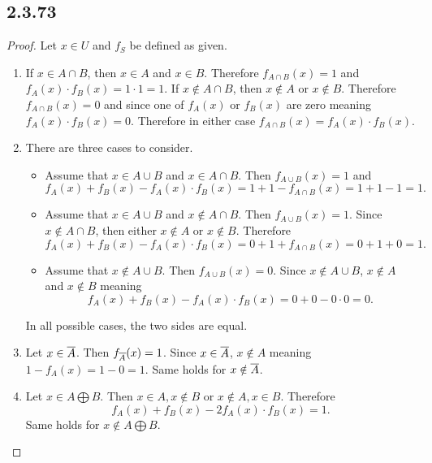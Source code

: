 \documentclass[12pt,titlepage]{extarticle}
\begin{document}
\subsection*{2.3.73}
\begin{proof}
    Let $x \in U$ and $f_S$ be defined as given.
    \begin{enumerate}[label=\alph*)]
        \item %
        If $x \in A \cap B$, then $x \in A$ and $x \in B$. Therefore $f_{A \cap B}(x) = 1$ and $f_{A}(x) \cdot f_{B}(x) = 1 \cdot 1 = 1$. If $x \notin A \cap B$, then $x \notin A$ or $x \notin B$. Therefore $f_{A \cap B}(x) = 0$ and since one of $f_{A}(x)$ or $f_{B}(x)$ are zero meaning $f_{A}(x) \cdot f_{B}(x) = 0$. Therefore in either case $f_{A \cap B}(x) = f_{A}(x) \cdot f_{B}(x)$.
        \item %
        There are three cases to consider.
        \begin{itemize}
            \item Assume that $x \in A \cup B$ and $x \in A \cap B$. Then $f_{A \cup B}(x) = 1$ and 
            \[
                f_A(x) + f_B(x) - f_A(x) \cdot f_B(x) = 1 + 1 - f_{A\cap B}(x) = 1 + 1 - 1 = 1
            .\]
        \item Assume that $x \in A \cup B$ and $x \notin A \cap B$. Then $f_{A \cup B}(x) = 1$. Since $x \notin A \cap B$, then either $x \notin A$ or $x \notin B$. Therefore
            \[
                f_A(x) + f_B(x) - f_A(x) \cdot f_B(x) = 0 + 1 + f_{A \cap B}(x) = 0 + 1 + 0 = 1
            .\]
        \item Assume that $x \notin A \cup B$. Then $f_{A \cup B}(x) = 0$. Since $x \notin A \cup B$, $x \notin A$ and $x \notin B$ meaning
            \[
                f_A(x) + f_B(x) - f_A(x) \cdot f_B(x) = 0 + 0 - 0 \cdot 0 = 0
            .\]
        \end{itemize}
        In all possible cases, the two sides are equal.
        \item %
        Let $x \in \overline{A}$. Then $f_{\overline{A}}(x) = 1$. Since $x \in \overline{A}$, $x \notin A$ meaning $1 - f_A(x) = 1 - 0 = 1$. Same holds for $x \notin \overline{A}$.
        \item %
        Let $x \in A \bigoplus B$. Then $x \in A, x \notin B$ or $x \notin A, x \in B$. Therefore
        \[
            f_A(x) + f_B(x) - 2 f_A(x) \cdot f_B(x) = 1
        .\]
        Same holds for $x \notin A \bigoplus B$.
    \end{enumerate}
\end{proof}
\end{document}
